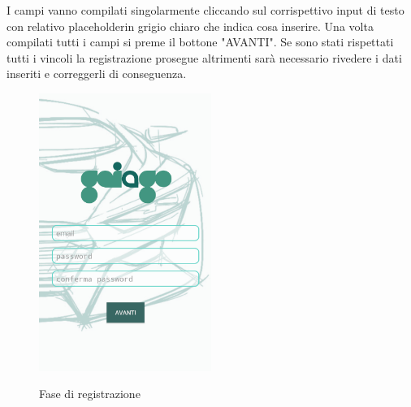 I campi vanno compilati singolarmente cliccando sul corrispettivo input di testo con relativo placeholder\glosp in grigio chiaro che indica cosa inserire. Una volta compilati tutti i campi si preme il bottone "AVANTI". Se sono stati rispettati tutti i vincoli la registrazione prosegue altrimenti sarà necessario rivedere i dati inseriti e correggerli di conseguenza. 
 \begin{figure}[H] 
 	\centering 
 	\includegraphics[width=0.5\textwidth]{res/images/registrazione.png}\\
 	\caption{Fase di registrazione}
 	\label{registrazione}
 \end{figure}

